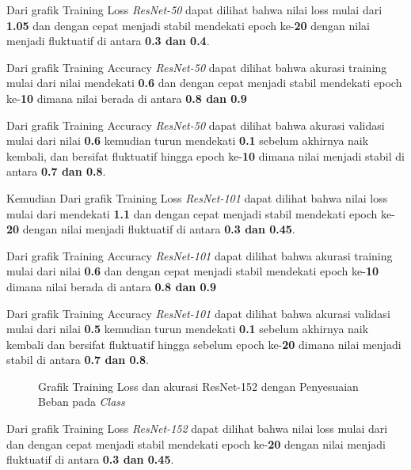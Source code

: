 Dari grafik Training Loss \emph{ResNet-50} dapat dilihat bahwa nilai loss mulai dari \textbf{1.05} dan dengan cepat menjadi stabil mendekati epoch ke-\textbf{20} dengan nilai menjadi fluktuatif di antara \textbf{0.3 dan 0.4}.

Dari grafik Training Accuracy \emph{ResNet-50} dapat dilihat bahwa akurasi training mulai dari nilai mendekati \textbf{0.6} dan dengan cepat menjadi stabil mendekati epoch ke-\textbf{10} dimana nilai berada di antara \textbf{0.8 dan 0.9} 

Dari grafik Training Accuracy \emph{ResNet-50} dapat dilihat bahwa akurasi validasi mulai dari nilai \textbf{0.6} kemudian turun mendekati \textbf{0.1} sebelum akhirnya naik kembali, dan bersifat fluktuatif hingga epoch ke-\textbf{10} dimana nilai menjadi stabil di antara \textbf{0.7 dan 0.8}.

Kemudian Dari grafik Training Loss \emph{ResNet-101} dapat dilihat bahwa nilai loss mulai dari mendekati \textbf{1.1} dan dengan cepat menjadi stabil mendekati epoch ke-\textbf{20} dengan nilai menjadi fluktuatif di antara \textbf{0.3 dan 0.45}.

Dari grafik Training Accuracy \emph{ResNet-101} dapat dilihat bahwa akurasi training mulai dari nilai \textbf{0.6} dan dengan cepat menjadi stabil mendekati epoch ke-\textbf{10} dimana nilai berada di antara \textbf{0.8 dan 0.9} 

Dari grafik Training Accuracy \emph{ResNet-101} dapat dilihat bahwa akurasi validasi mulai dari nilai \textbf{0.5} kemudian turun mendekati \textbf{0.1} sebelum akhirnya naik kembali dan bersifat fluktuatif hingga sebelum epoch ke-\textbf{20} dimana nilai menjadi stabil di antara \textbf{0.7 dan 0.8}.

\begin{figure}[H]
	\centering
	\caption{Grafik Training Loss dan akurasi ResNet-152 dengan Penyesuaian Beban pada \emph{Class}}
	\label{fig:graphTrainingWeightedPt3}
\end{figure}
Dari grafik Training Loss \emph{ResNet-152} dapat dilihat bahwa nilai loss mulai dari \textbf{} dan dengan cepat menjadi stabil mendekati epoch ke-\textbf{20} dengan nilai menjadi fluktuatif di antara \textbf{0.3 dan 0.45}.

